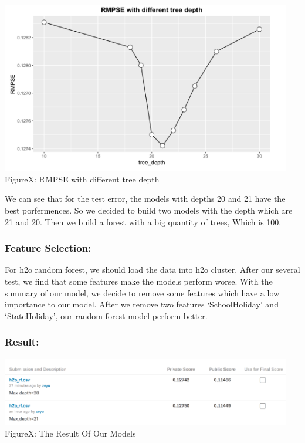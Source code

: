 \documentclass[a4paper]{article}
\begin{document}
	\begin{center}
	\includegraphics[width=5in]{cross.png}\\
	FigureX: RMPSE with different tree depth
	\end{center}

	We can see that for the test error, the models with depths 20 and 21 have the best porfermences. So we decided to build two models with the depth which are 21 and 20. Then we build a forest with a big quantity of trees, Which is 100.

	\subsubsection{Feature Selection:}

	For h2o random forest, we should load the data into h2o cluster. After our several test, we find that some features make the models perform worse. With the summary of our model, we decide to remove some features which have a low importance to our model. After we remove two features `SchoolHoliday' and `StateHoliday', our random forest model perform better.

	\subsubsection{Result:}

	\begin{center}
	\includegraphics[width=5in]{h2ores.png}\\
	FigureX: The Result Of Our Models
	\end{center}	
\end{document}
